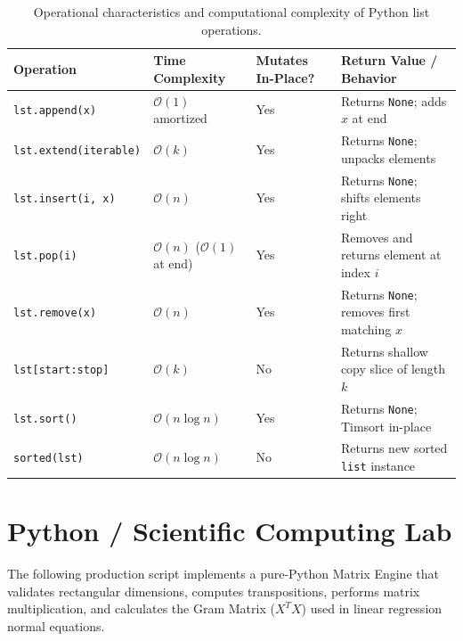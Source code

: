 \begin{table}[htbp]
\centering
\small
\begin{tabular}{p{2.8cm} p{2.2cm} p{2.8cm} p{4.2cm}}
\hline
\textbf{Operation} & \textbf{Time Complexity} & \textbf{Mutates In-Place?} & \textbf{Return Value / Behavior} \\
\hline
\texttt{lst.append(x)} & $\mathcal{O}(1)$ amortized & Yes & Returns \texttt{None}; adds $x$ at end \\
\texttt{lst.extend(iterable)} & $\mathcal{O}(k)$ & Yes & Returns \texttt{None}; unpacks elements \\
\texttt{lst.insert(i, x)} & $\mathcal{O}(n)$ & Yes & Returns \texttt{None}; shifts elements right \\
\texttt{lst.pop(i)} & $\mathcal{O}(n)$ ($\mathcal{O}(1)$ at end) & Yes & Removes and returns element at index $i$ \\
\texttt{lst.remove(x)} & $\mathcal{O}(n)$ & Yes & Returns \texttt{None}; removes first matching $x$ \\
\texttt{lst[start:stop]} & $\mathcal{O}(k)$ & No & Returns shallow copy slice of length $k$ \\
\texttt{lst.sort()} & $\mathcal{O}(n \log n)$ & Yes & Returns \texttt{None}; Timsort in-place \\
\texttt{sorted(lst)} & $\mathcal{O}(n \log n)$ & No & Returns new sorted \texttt{list} instance \\
\hline
\end{tabular}
\caption{Operational characteristics and computational complexity of Python list operations.}
\label{tab:list_complexity}
\end{table}

\section{Python / Scientific Computing Lab}

The following production script implements a pure-Python Matrix Engine that validates rectangular dimensions, computes transpositions, performs matrix multiplication, and calculates the Gram Matrix ($X^T X$) used in linear regression normal equations.

